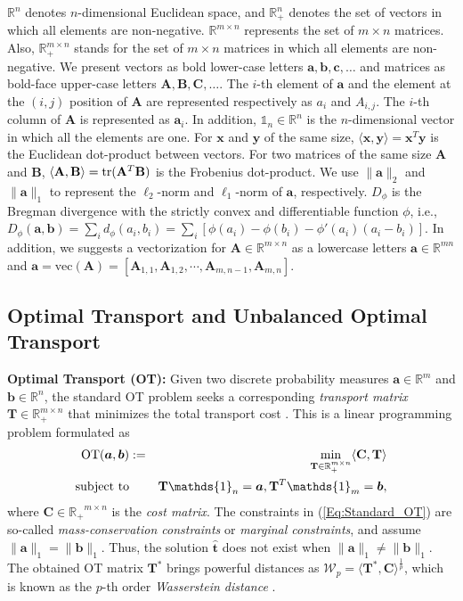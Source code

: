 \documentclass[twoside]{article}
\theoremstyle{plain}
\newcommand{\R}{\mathbb{R}}
\newcommand{\one}{\mathds{1}}
\newcommand{\mat}[1]{\mathbf{#1}}
\renewcommand{\vec}[1]{\bm{#1}}
\begin{document}
$\mathbb{R}^n$ denotes $n$-dimensional Euclidean space, and $\mathbb{R}^n_+$ denotes the set of vectors in which all elements are non-negative. $\mathbb{R}^{m \times n}$ represents the set of $m \times n$ matrices. Also, $\mathbb{R}^{m \times n}_+$ stands for the set of $m \times n$ matrices in which all elements are non-negative. We present vectors as bold lower-case letters $\vec{a},\vec{b},\vec{c},\dots$ and matrices as bold-face upper-case letters $\mat{A},\mat{B},\mat{C},\dots$. The $i$-th element of $\vec{a}$ and the element at the $(i,j)$ position of $\mat{A}$ are represented respectively as $a_i$ and ${A}_{i,j}$. The $i$-th column of $\mat{A}$ is represented as $\vec{a}_i$. In addition, $\one_n \in \mathbb{R}^n$ is the $n$-dimensional vector in which all the elements are one. For $\vec{x}$ and $\vec{y}$ of the same size, $\langle \vec{x},\vec{y} \rangle = \vec{x}^T\vec{y}$ is the Euclidean dot-product between vectors. For two matrices of the same size $\mat{A}$ and $\mat{B}$, $\langle \mat{A},\mat{B}\rangle={\rm tr}(\mat{A}^T\mat{B})$ is the Frobenius dot-product. We use $\|\vec{a}\|_2$ and $\|\vec{a}\|_1$ to represent the $\ell_2$-norm and $\ell_1$-norm of $\vec{a}$, respectively. $D_\phi$ is the Bregman divergence with the strictly convex and differentiable function $\phi$, i.e., $D_\phi(\vec{a},\vec{b})=\sum_{i} d_\phi(a_i, b_i)=\sum_i [\phi(a_i) - \phi(b_i) - \phi'(a_i)(a_i -b_i)]$. In addition, we suggests a vectorization for $\mat{A} \in \mathbb{R}^{m \times n}$ as a lowercase letters $\vec{a} \in \mathbb{R}^{mn}$ and $\vec{a}=\text{vec}(\mat{A})=[\mat{A}_{1,1}, \mat{A}_{1,2}, \cdots, \mat{A}_{m,n-1}, \mat{A}_{m,n}]$.
 


\subsection{Optimal Transport and Unbalanced Optimal Transport}
{\bf Optimal Transport (OT):} Given two discrete probability measures $\vec{a}\in \R^{m}$ and $\vec{b} \in \R^{n}$, the standard OT problem seeks a corresponding {\it transport matrix} $\mat{T} \in \R_{+}^{m \times n}$ that minimizes the total transport cost \citep{Kantorovich_1942}. This is a linear programming problem formulated as
\begin{eqnarray}
\label{Eq:Standard_OT}
\operatorname{OT}(\vec{a},\vec{b}) &:=& \min_{ \mat{T} \in \R_{+}^{m \times n}} \langle \mat{C}, \mat{T} \rangle \\
\text{subject\ to}&& \mat{T} \one_n= \vec{a}, \mat{T}^{T}\one_m = \vec{b}, \notag
\end{eqnarray}
where $\mat{C} \in \mathbb{R_{+}}^{m \times n}$ is the {\it cost matrix}. The constraints in (\ref{Eq:Standard_OT}) are so-called {\it mass-conservation constraints} or {\it marginal constraints}, and assume $\|\vec{a}\|_1 = \|\vec{b}\|_1$. Thus, the solution $\hat{\vec{t}}$ does not exist when $\|\vec{a}\|_1 \neq \|\vec{b}\|_1$. The obtained OT matrix $\mat{T}^*$ brings powerful distances as $\mathcal{W}_p = \langle \mat{T}^*,\mat{C} \rangle^{\frac{1}{p}}$, which is known as the $p$-th order {\it Wasserstein distance} \citep{Villani_2008_OTBook}. 
\end{document}
